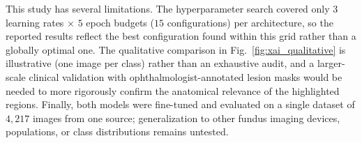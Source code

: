 This study has several limitations.
The hyperparameter search covered only $3$ learning rates $\times$ $5$ epoch budgets ($15$ configurations) per architecture, so the reported results reflect the best configuration found within this grid rather than a globally optimal one.
The qualitative comparison in Fig.~\ref{fig:xai_qualitative} is illustrative (one image per class) rather than an exhaustive audit, and a larger-scale clinical validation with ophthalmologist-annotated lesion masks would be needed to more rigorously confirm the anatomical relevance of the highlighted regions.
Finally, both models were fine-tuned and evaluated on a single dataset of $4{,}217$ images from one source; generalization to other fundus imaging devices, populations, or class distributions remains untested.
